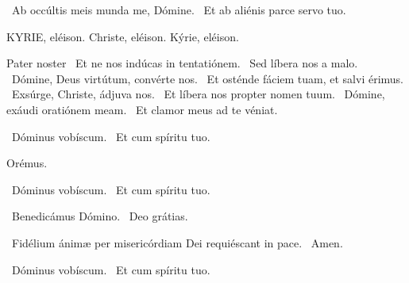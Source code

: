 \V\ Ab occúltis meis munda me, Dómine. \R\ Et ab aliénis parce servo tuo.



KYRIE, eléison. Christe, eléison. Kýrie, eléison.

Pater noster  \V\ Et ne nos indúcas in tentatiónem. \R\ Sed líbera nos a malo. \V\ Dómine, Deus virtútum, convérte nos. \R\ Et osténde fáciem tuam, et salvi érimus. \V\ Exsúrge, Christe, ádjuva nos. \R\ Et líbera nos propter nomen tuum. \V\ Dómine, exáudi oratiónem meam. \R\ Et clamor meus ad te véniat.


\V\ Dóminus vobíscum. \R\ Et cum spíritu tuo.

Orémus.



\V\ Dóminus vobíscum. \R\ Et cum spíritu tuo.

\V\ Benedicámus Dómino. \R\ Deo grátias.

\V\ Fidélium ánimæ per misericórdiam Dei requiéscant in pace. \R\ Amen.


\V\ Dóminus vobíscum. \R\ Et cum spíritu tuo.


